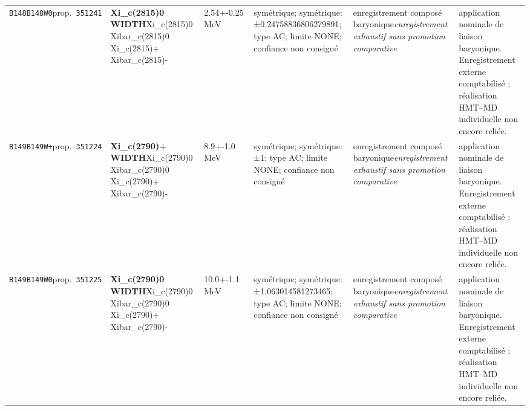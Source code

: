 \begin{landscape}
\begin{longtable}{L{1.85cm}L{4.45cm}L{2.35cm}L{4.05cm}L{3.35cm}L{7.15cm}}
\texttt{B148}\newline \texttt{B148W0}\newline prop.\ \texttt{351241} & \textbf{Xi\_\allowbreak{}c(2815)0 WIDTH}\newline Xi\_\allowbreak{}c(2815)0 \textbar{}\allowbreak{} Xibar\_\allowbreak{}c(2815)0 \textbar{}\allowbreak{} Xi\_\allowbreak{}c(2815)+ \textbar{}\allowbreak{} Xibar\_\allowbreak{}c(2815)- & 2.54+-0.25\,MeV & symétrique; symétrique: ±0.24758836806279891; type AC; limite NONE; confiance non consigné & enregistrement composé baryonique\newline \emph{enregistrement exhaustif sans promotion comparative} & application nominale de liaison baryonique. Enregistrement externe comptabilisé ; réalisation HMT--MD individuelle non encore reliée. \\
\texttt{B149}\newline \texttt{B149W+}\newline prop.\ \texttt{351224} & \textbf{Xi\_\allowbreak{}c(2790)+ WIDTH}\newline Xi\_\allowbreak{}c(2790)0 \textbar{}\allowbreak{} Xibar\_\allowbreak{}c(2790)0 \textbar{}\allowbreak{} Xi\_\allowbreak{}c(2790)+ \textbar{}\allowbreak{} Xibar\_\allowbreak{}c(2790)- & 8.9+-1.0\,MeV & symétrique; symétrique: ±1; type AC; limite NONE; confiance non consigné & enregistrement composé baryonique\newline \emph{enregistrement exhaustif sans promotion comparative} & application nominale de liaison baryonique. Enregistrement externe comptabilisé ; réalisation HMT--MD individuelle non encore reliée. \\
\texttt{B149}\newline \texttt{B149W0}\newline prop.\ \texttt{351225} & \textbf{Xi\_\allowbreak{}c(2790)0 WIDTH}\newline Xi\_\allowbreak{}c(2790)0 \textbar{}\allowbreak{} Xibar\_\allowbreak{}c(2790)0 \textbar{}\allowbreak{} Xi\_\allowbreak{}c(2790)+ \textbar{}\allowbreak{} Xibar\_\allowbreak{}c(2790)- & 10.0+-1.1\,MeV & symétrique; symétrique: ±1.063014581273465; type AC; limite NONE; confiance non consigné & enregistrement composé baryonique\newline \emph{enregistrement exhaustif sans promotion comparative} & application nominale de liaison baryonique. Enregistrement externe comptabilisé ; réalisation HMT--MD individuelle non encore reliée. \\

\end{longtable}
\end{landscape}
